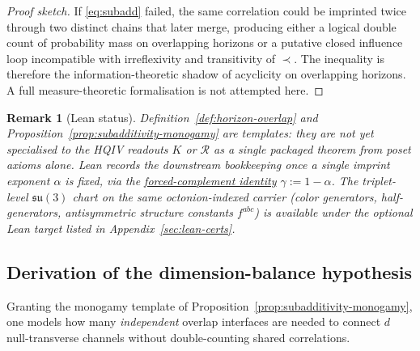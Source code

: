 \documentclass[11pt]{amsart}
\newtheorem{remark}[theorem]{Remark}
\begin{document}
\begin{proof}[Proof sketch]
If \eqref{eq:subadd} failed, the same correlation could be imprinted twice through two distinct chains that later merge, producing either a logical double count of probability mass on overlapping horizons or a putative closed influence loop incompatible with irreflexivity and transitivity of \(\prec\). The inequality is therefore the information-theoretic shadow of acyclicity on overlapping horizons. A full measure-theoretic formalisation is not attempted here.
\end{proof}

\begin{remark}[Lean status]
\label{rem:causal-subadd-lean}
Definition~\ref{def:horizon-overlap} and Proposition~\ref{prop:subadditivity-monogamy} are \emph{templates}: they are not yet specialised to the HQIV readouts \(K\) or \(\mathcal{R}\) as a single packaged theorem from poset axioms alone. Lean records the downstream \emph{bookkeeping} once a single imprint exponent \(\alpha\) is fixed, via the \hyperref[lean:gamma-complement]{forced-complement identity} \(\gamma:=1-\alpha\). The triplet-level \(\mathfrak{su}(3)\) chart on the same octonion-indexed carrier (color generators, half-generators, antisymmetric structure constants \(f^{abc}\)) is available under the optional Lean target listed in Appendix~\ref{sec:lean-certs}.
\end{remark}

\subsection{Derivation of the dimension-balance hypothesis}

Granting the monogamy template of Proposition~\ref{prop:subadditivity-monogamy}, one models how many \emph{independent} overlap interfaces are needed to connect \(d\) null-transverse channels without double-counting shared correlations.
\end{document}
